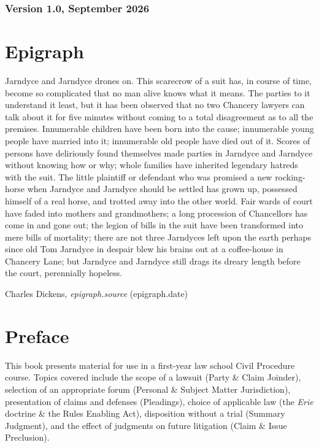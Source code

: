 \documentclass[11pt,letterpaper,twoside]{article}
\renewenvironment{quote}{%
   \list{}{%
     \leftmargin2em   %
     \rightmargin\leftmargin\parsep .1em }
   \item\relax
}
{\endlist}
\begin{document}
\subsection*{Version 1.0, September 2026}\label{version}

\chapter*{Epigraph}\label{epigraph}


\begin{quote}
{Jarndyce and Jarndyce drones on. This scarecrow of a suit has, in
course of time, become so complicated that no man alive knows what it
means. The parties to it understand it least, but it has been observed
that no two Chancery lawyers can talk about it for five minutes without
coming to a total disagreement as to all the premises. Innumerable
children have been born into the cause; innumerable young people have
married into it; innumerable old people have died out of it. Scores of
persons have deliriously found themselves made parties in Jarndyce and
Jarndyce without knowing how or why; whole families have inherited
legendary hatreds with the suit. The little plaintiff or defendant who
was promised a new rocking-horse when Jarndyce and Jarndyce should be
settled has grown up, possessed himself of a real horse, and trotted
away into the other world. Fair wards of court have faded into mothers
and grandmothers; a long procession of Chancellors has come in and gone
out; the legion of bills in the suit have been transformed into mere
bills of mortality; there are not three Jarndyces left upon the earth
perhaps since old Tom Jarndyce in despair blew his brains out at a
coffee-house in Chancery Lane; but Jarndyce and Jarndyce still drags its
dreary length before the court, perennially hopeless.}
\end{quote}

{{} Charles Dickens, \emph{epigraph.source}
(epigraph.date)}

\chapter*{Preface}\label{preface}


This book presents material for use in a first-year law school Civil
Procedure course. Topics covered include the scope of a lawsuit (Party
\& Claim Joinder), selection of an appropriate forum (Personal \&
Subject Matter Jurisdiction), presentation of claims and defenses
(Pleadings), choice of applicable law (the \emph{Erie} doctrine \& the
Rules Enabling Act), disposition without a trial (Summary Judgment), and
the effect of judgments on future litigation (Claim \& Issue
Preclusion).
\end{document}
